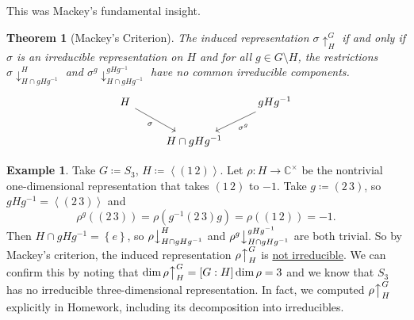 \documentclass[12pt]{article}
\newcommand{\cx}{\mathbb{C}}
\newcommand\inv[1]{#1^{-1}}
\newcommand\paren[1]{\left( #1 \right)}
\newcommand\setb[1]{\left \{ #1 \right \}}
\newcommand{\vbrack}[1]{\left \langle #1 \right \rangle}
\newtheorem{theorem}{Theorem}[section]
\theoremstyle{definition}
\newtheorem{example}{Example}[section]
\begin{document}
This was Mackey's fundamental insight.
\begin{theorem}[Mackey's Criterion]
    The induced representation $\sigma\uparrow_H^G$ if and only if $\sigma$ is an irreducible representation on $H$ and for all $g \in G \setminus H$, the restrictions $\sigma\downarrow^H_{H \cap g H \inv{g}}$ and $\sigma^g \downarrow^{g H \inv{g}}_{H \cap g H \inv{g}}$ have no common irreducible components.
    \begin{equation}
        \begin{tikzcd}
            H \arrow[dr,"\sigma"'] &  & g H \inv{g} \arrow[dl,"\sigma^g"] \\
             & H \cap g H \inv{g} & 
        \end{tikzcd}
    \end{equation}
\end{theorem}
\begin{example}
    Take $G \coloneqq  S_3$, $H \coloneqq  \vbrack{(1\,2)}$. Let $\rho : H \to \cx^{\times}$ be the nontrivial one-dimensional representation that takes $(1\,2)$ to $-1$. Take $g \coloneqq  (2\,3)$, so $g H \inv{g} = \vbrack{(2\,3)}$ and 
    \begin{equation}
        \rho^g \paren{ (2\,3) } = \rho \paren{ \inv{g} (2\,3) g } = \rho \paren{ (1\,2) } = -1.
    \end{equation}
    Then $H \cap g H \inv{g} = \setb{e}$, so $\rho \big\downarrow^H_{H \cap g H \inv{g}}$ and $\rho^g \big\downarrow^{g H \inv{g}}_{H \cap g H \inv{g}}$ are both trivial. So by Mackey's criterion, the induced representation $\rho \big\uparrow_H^G$ is \underline{not irreducible}. We can confirm this by noting that $\dim \rho \big\uparrow_H^G = [G : H]\dim \rho = 3$ and we know that $S_3$ has no irreducible three-dimensional representation. In fact, we computed $\rho \big\uparrow_H^G$ explicitly in Homework, including its decomposition into irreducibles. 
\end{example}
\end{document}
